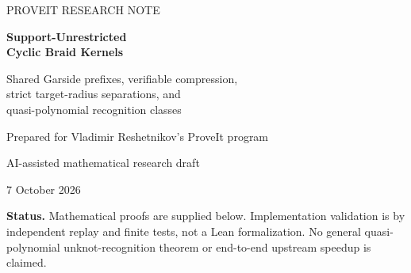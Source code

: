 \documentclass[11pt,a4paper]{article}
\theoremstyle{definition}\newtheorem{definition}[theorem]{Definition}
\theoremstyle{remark}\newtheorem{remark}[theorem]{Remark}
\begin{document}
\begin{titlepage}
\vspace*{10mm}
{\color{ink}\Large PROVEIT RESEARCH NOTE\par}
\vspace{12mm}
{\color{ink}\huge\bfseries Support-Unrestricted\\[3pt] Cyclic Braid Kernels\par}
\vspace{7mm}
{\Large Shared Garside prefixes, verifiable compression,\\
strict target-radius separations, and\\quasi-polynomial recognition classes\par}
\vspace{11mm}
{\large Prepared for Vladimir Reshetnikov's ProveIt program\par}
{AI-assisted mathematical research draft\par}
{7 October 2026\par}
\vspace{9mm}
\begin{abstract}
We develop an exact, certificate-producing preprocessing layer for the
ProveIt unknot recognizer. It removes the two-generator support restriction
of the existing local braid compressor and shares one table of Garside
prefix states over every cyclic cut. A second trie shares arithmetic among
finite target words. For a fixed target radius, the resulting optimizer is
polynomial-time and returns an optimal set of disjoint substitutions for its
explicit one-pass rule set. We give bit-complexity and certificate-size bounds,
including a sharper bound in terms of the maximum canonical prefix height.

An explicit infinite family of four-strand unknots separates target radii
one and two: the radius-one cyclic kernel leaves all $4m+1$ letters,
whereas radius two leaves exactly three. The proof uses an induced lattice
path and a signed-crossing obstruction to single-letter replacements across
the remaining generator. A different family consists of geodesic
three-braid representatives of the unknot, proving that unrestricted braid
equality shortening alone cannot replace closure-aware operations.

An uncapped composition with exact Khovanov homology has quasi-polynomial
complexity on constructively recognizable small-kernel families, including
conjugated flat multi-letter inflations. We do not prove a small-kernel
bound for arbitrary unknots. The accompanying standard-library Python
implementation includes an independent local-move verifier, a cheaper
whole-word normal-form shortcut, 47 passing tests, exhaustive independent
checks, raw paired measurements, and integration instructions. Measured
speedups concern shared versus duplicated prefix algebra, not the complete
upstream recognizer.
\end{abstract}
\vfill
\noindent\colorbox{lightink}{\parbox{\dimexpr\textwidth-2\fboxsep\relax}{
\textbf{Status.} Mathematical proofs are supplied below. Implementation
validation is by independent replay and finite tests, not a Lean
formalization. No general quasi-polynomial unknot-recognition theorem or
end-to-end upstream speedup is claimed.}}
\end{titlepage}
\end{document}

